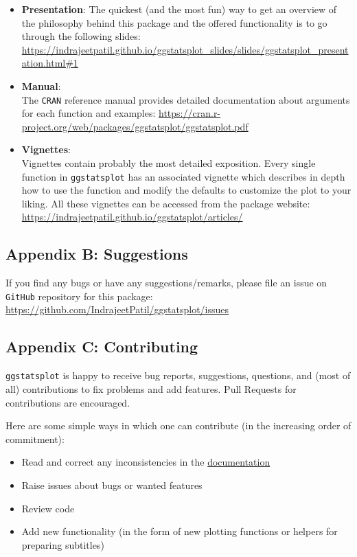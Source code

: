 \documentclass[]{article}
\begin{document}
\begin{itemize}
\item
  \textbf{Presentation}:
  The quickest (and the most fun) way to get an overview of
  the philosophy behind this package and the offered functionality is to go
  through the following slides:
  \url{https://indrajeetpatil.github.io/ggstatsplot_slides/slides/ggstatsplot_presentation.html\#1}
\item
  \textbf{Manual}:\\
  The \texttt{CRAN} reference manual provides detailed documentation about arguments
  for each function and examples:
  \url{https://cran.r-project.org/web/packages/ggstatsplot/ggstatsplot.pdf}
\item
  \textbf{Vignettes}:\\
  Vignettes contain probably the most detailed exposition. Every single
  function in \texttt{ggstatsplot} has an associated vignette which describes in
  depth how to use the function and modify the defaults to customize the plot
  to your liking. All these vignettes can be accessed from the package
  website: \url{https://indrajeetpatil.github.io/ggstatsplot/articles/}
\end{itemize}

\hypertarget{appendix-b-suggestions}{%
\subsection{Appendix B: Suggestions}\label{appendix-b-suggestions}}

If you find any bugs or have any suggestions/remarks, please file an issue on
\texttt{GitHub} repository for this package:
\url{https://github.com/IndrajeetPatil/ggstatsplot/issues}

\hypertarget{appendix-c-contributing}{%
\subsection{Appendix C: Contributing}\label{appendix-c-contributing}}

\texttt{ggstatsplot} is happy to receive bug reports, suggestions, questions, and (most
of all) contributions to fix problems and add features. Pull Requests for
contributions are encouraged.

Here are some simple ways in which one can contribute (in the increasing order
of commitment):

\begin{itemize}
\item
  Read and correct any inconsistencies in the
  \href{https://indrajeetpatil.github.io/ggstatsplot/}{documentation}
\item
  Raise issues about bugs or wanted features
\item
  Review code
\item
  Add new functionality (in the form of new plotting functions or helpers for
  preparing subtitles)
\end{itemize}
\end{document}

